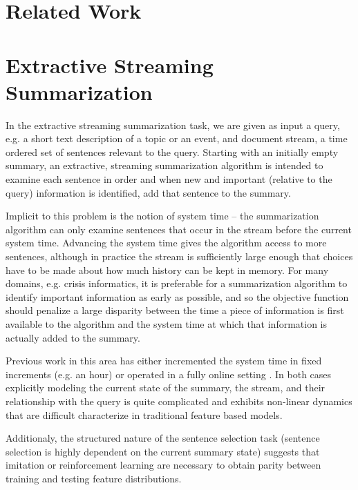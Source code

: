 \documentclass[12pt]{article}
\begin{document}
\section{Related Work}

\section{Extractive Streaming Summarization}

  In the extractive streaming summarization task, we are given as input
  a query, e.g. a short text description of a topic or an event, and 
  document stream, a time ordered set of sentences 
  relevant to the query. Starting with an initially empty summary,  
  an extractive, streaming summarization algorithm is intended to 
  examine each sentence in order and when new and important (relative to the 
  query) information is identified, add that sentence to the summary. 

  Implicit to this problem is the notion of system time -- the 
  summarization algorithm can only examine sentences that occur in the stream
  before the current system time. Advancing the system time gives the algorithm
  access to more sentences, although in practice the stream is sufficiently 
  large enough that choices have to be made about how much history can be 
  kept in memory. For many domains, e.g. crisis informatics, it is preferable
  for a summarization algorithm to identify important information as early as 
  possible, and so the objective function should penalize a large disparity
  between the time a piece of information is first available to the algorithm
  and the system time at which that information is actually added to the 
  summary.

  Previous work in this area has either incremented the system time in fixed
  increments (e.g. an hour) 
  \cite{mccreadie2014incremental,kedzie2015predicting} or operated in
  a fully online setting \cite{guo2013updating,kedzie2016real}. In both cases 
  explicitly 
  modeling the current state of the summary, the stream, and their relationship
  with the query is quite complicated and exhibits non-linear dynamics that 
  are difficult characterize in traditional feature based models.

  Additionaly, the structured nature of the sentence selection task 
  (sentence selection is
  highly dependent on the current summary state) suggests that imitation 
  or reinforcement learning are necessary to obtain parity between training
  and testing feature distributions. 
\end{document}
